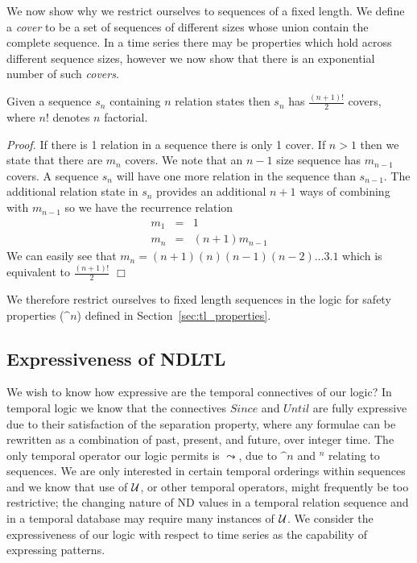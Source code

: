 We now show why we restrict ourselves to sequences of a fixed
length. We define a {\em cover} to be a set of sequences of different
sizes whose union contain the complete sequence. In a time series
there may be properties which hold across different sequence sizes,
however we now show that there is an exponential number of such {\em
covers}.  

\begin{lemma}\label{lemma:covernum}
\begin{rm}
Given a sequence $s_n$ containing $n$ relation states then $s_n$ has
$\frac{(n+1)!}{2}$ covers, where $n!$ denotes $n$ factorial.
\end{rm}
\end{lemma}

{\em Proof.} If there is 1 relation in a sequence there is only 1
cover.  If $n > 1$
then we state that there are $m_n$ covers.  We note that an $n-1$ size
sequence has $m_{n-1}$ covers. A sequence $s_n$ will have one more
relation in the sequence than $s_{n-1}$. The additional relation state in
$s_n$ provides an additional $n+1$ ways of combining with $m_{n-1}$ so
we have the recurrence relation
\begin{eqnarray*}
	m_1	& = & 1 \\
	m_n	& = & (n+1)m_{n-1}
\end{eqnarray*}
We can easily see that $m_n = (n+1)(n)(n-1)(n-2) \ldots 3.1$
which is equivalent to $\frac{(n+1)!}{2}$  $\Box$

\medskip

We therefore restrict ourselves to fixed length sequences in the logic
for safety properties ($\bm^n$) defined in Section~\ref{sec:tl_properties}.

\subsection{Expressiveness of NDLTL}
We wish to know how expressive are the temporal connectives of our
logic? In temporal logic we know that the connectives $Since$ and
$Until$ are fully expressive \cite{gps80} due to their satisfaction of
the separation property, where any formulae can be rewritten as a
combination of past, present, and future, over integer time. 
The only temporal operator
our logic permits is $\leadsto$, due to $\bm^n$ and \diam$^n$ relating
to sequences. We are only interested in certain
temporal orderings within sequences and we know that use of ${\cal
U}$, or other temporal operators, 
might frequently be too restrictive; the changing nature of ND values
in a temporal relation sequence and in a temporal database may require
many instances of ${\cal U}$.
We consider the expressiveness of
our logic with respect to time series as the capability of expressing
patterns. 

